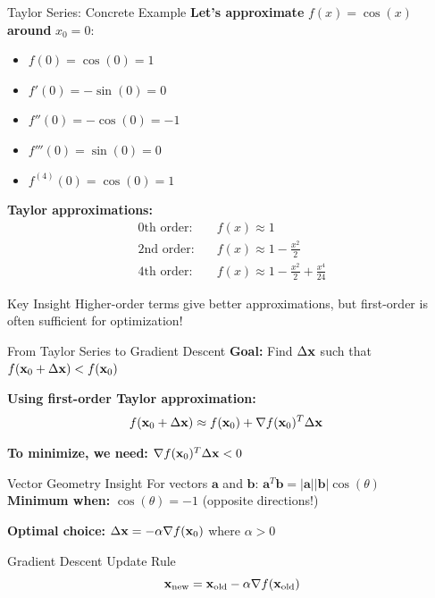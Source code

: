 \documentclass[usenames,dvipsnames]{beamer}
\begin{document}
  \begin{frame}{Taylor Series: Concrete Example}
    \textbf{Let's approximate} $f(x) = \cos(x)$ \textbf{around} $x_0 = 0$:
    
    \begin{itemize}[<+->]
        \item $f(0) = \cos(0) = 1$
        \item $f'(0) = -\sin(0) = 0$
        \item $f''(0) = -\cos(0) = -1$
        \item $f'''(0) = \sin(0) = 0$
        \item $f^{(4)}(0) = \cos(0) = 1$
    \end{itemize}
    
    \pause
    \textbf{Taylor approximations:}
    \begin{align}
        \text{0th order:} \quad &f(x) \approx 1\\
        \text{2nd order:} \quad &f(x) \approx 1 - \frac{x^2}{2}\\
        \text{4th order:} \quad &f(x) \approx 1 - \frac{x^2}{2} + \frac{x^4}{24}
    \end{align}
    
    \pause
    \begin{alertbox}{Key Insight}
    Higher-order terms give better approximations, but first-order is often sufficient for optimization!
    \end{alertbox}
  \end{frame}

  \begin{frame}{From Taylor Series to Gradient Descent}
    \textbf{Goal:} Find $\Delta \mathbf{x}$ such that $f(\mathbf{x}_0 + \Delta \mathbf{x}) < f(\mathbf{x}_0)$
    
    \pause
    \textbf{Using first-order Taylor approximation:}
    \begin{align}
        f(\mathbf{x}_0 + \Delta \mathbf{x}) &\approx f(\mathbf{x}_0) + \nabla f(\mathbf{x}_0)^T \Delta \mathbf{x}
    \end{align}
    
    \pause
    \textbf{To minimize, we need:} $\nabla f(\mathbf{x}_0)^T \Delta \mathbf{x} < 0$
    
    \pause
    \begin{examplebox}{Vector Geometry Insight}
    For vectors $\mathbf{a}$ and $\mathbf{b}$: $\mathbf{a}^T\mathbf{b} = |\mathbf{a}||\mathbf{b}|\cos(\theta)$
    \\\textbf{Minimum when:} $\cos(\theta) = -1$ (opposite directions!)
    \end{examplebox}
    
    \pause
    \textbf{Optimal choice:} $\Delta \mathbf{x} = -\alpha \nabla f(\mathbf{x}_0)$ where $\alpha > 0$
    
    \pause
    \begin{definitionbox}{Gradient Descent Update Rule}
    $$\mathbf{x}_{\text{new}} = \mathbf{x}_{\text{old}} - \alpha \nabla f(\mathbf{x}_{\text{old}})$$
    \end{definitionbox}
  \end{frame}
\end{document}
